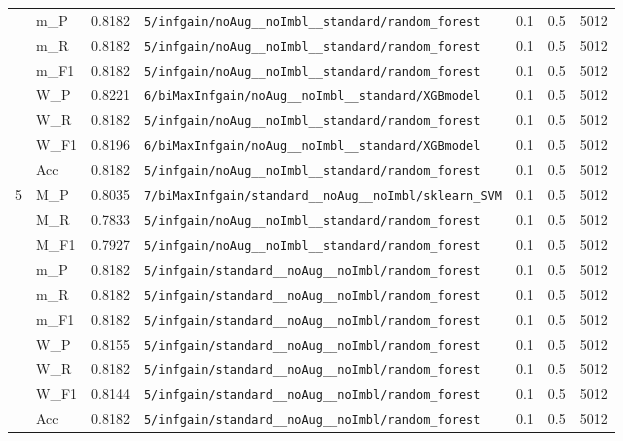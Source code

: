 \begin{table}[htbp]
\begin{tabular}{|c|l|c|>{\ttfamily\footnotesize}p{7.2cm}|c|c|c|}
 & m\_P & 0.8182 & \texttt{5/infgain/noAug\_\_noImbl\_\_standard/random\_forest} & 0.1 & 0.5  & 5012 \\ 
 & m\_R & 0.8182 & \texttt{5/infgain/noAug\_\_noImbl\_\_standard/random\_forest} & 0.1 & 0.5  & 5012 \\ 
 & m\_F1 & 0.8182 & \texttt{5/infgain/noAug\_\_noImbl\_\_standard/random\_forest} & 0.1 & 0.5  & 5012 \\ 
 & W\_P & 0.8221 & \texttt{6/biMaxInfgain/noAug\_\_noImbl\_\_standard/XGBmodel} & 0.1 & 0.5  & 5012 \\ 
 & W\_R & 0.8182 & \texttt{5/infgain/noAug\_\_noImbl\_\_standard/random\_forest} & 0.1 & 0.5  & 5012 \\ 
 & W\_F1 & 0.8196 & \texttt{6/biMaxInfgain/noAug\_\_noImbl\_\_standard/XGBmodel} & 0.1 & 0.5  & 5012 \\ 
 & Acc & 0.8182 & \texttt{5/infgain/noAug\_\_noImbl\_\_standard/random\_forest} & 0.1 & 0.5  & 5012 \\ 
\hline
\multirow{10}{*}{5} & M\_P & 0.8035 & \texttt{7/biMaxInfgain/standard\_\_noAug\_\_noImbl/sklearn\_SVM} & 0.1 & 0.5  & 5012 \\ 
 & M\_R & 0.7833 & \texttt{5/infgain/noAug\_\_noImbl\_\_standard/random\_forest} & 0.1 & 0.5  & 5012 \\ 
 & M\_F1 & 0.7927 & \texttt{5/infgain/noAug\_\_noImbl\_\_standard/random\_forest} & 0.1 & 0.5  & 5012 \\ 
 & m\_P & 0.8182 & \texttt{5/infgain/standard\_\_noAug\_\_noImbl/random\_forest} & 0.1 & 0.5  & 5012 \\ 
 & m\_R & 0.8182 & \texttt{5/infgain/standard\_\_noAug\_\_noImbl/random\_forest} & 0.1 & 0.5  & 5012 \\ 
 & m\_F1 & 0.8182 & \texttt{5/infgain/standard\_\_noAug\_\_noImbl/random\_forest} & 0.1 & 0.5  & 5012 \\ 
 & W\_P & 0.8155 & \texttt{5/infgain/standard\_\_noAug\_\_noImbl/random\_forest} & 0.1 & 0.5  & 5012 \\ 
 & W\_R & 0.8182 & \texttt{5/infgain/standard\_\_noAug\_\_noImbl/random\_forest} & 0.1 & 0.5  & 5012 \\ 
 & W\_F1 & 0.8144 & \texttt{5/infgain/standard\_\_noAug\_\_noImbl/random\_forest} & 0.1 & 0.5  & 5012 \\ 
 & Acc & 0.8182 & \texttt{5/infgain/standard\_\_noAug\_\_noImbl/random\_forest} & 0.1 & 0.5  & 5012 \\ 
\hline
\end{tabular}
\end{table}